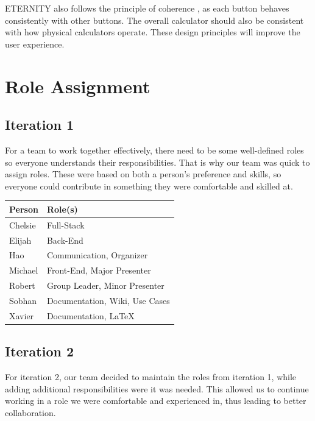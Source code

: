 \documentclass[11pt,onside]{report}
\begin{document}
ETERNITY also follows the principle of coherence \cite{uid-principles}, as each button behaves consistently with other buttons. The overall calculator should also be consistent with how physical calculators operate. These design principles will improve the user experience.

\section{Role Assignment}

\subsection{Iteration 1}
For a team to work together effectively, there need to be some well-defined roles so everyone understands their responsibilities. That is why our team was quick to assign roles. These were based on both a person's preference and skills, so everyone could contribute in something they were comfortable and skilled at.
\begin{center}
\begin{tabular}{|l|l|}
    \hline
    \bf{Person} & \bf{Role(s)}  \\
    \hline
    Chelsie & Full-Stack \\
    \hline
    Elijah & Back-End \\
    \hline
    Hao & Communication, Organizer \\
    \hline
    Michael & Front-End, Major Presenter \\
    \hline
    Robert & Group Leader, Minor Presenter \\
    \hline
    Sobhan & Documentation, Wiki, Use Cases \\
    \hline
    Xavier & Documentation, \LaTeX{} \\
    \hline
\end{tabular}
\end{center}

\subsection{Iteration 2}

For iteration 2, our team decided to maintain the roles from iteration 1, while adding additional responsibilities were it was needed. This allowed us to continue working in a role we were comfortable and experienced in, thus leading to better collaboration.
\end{document}
